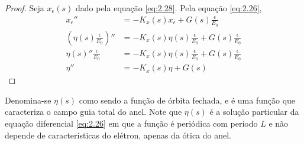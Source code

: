 \begin{proof}
	Seja $x_\epsilon(s)$ dado pela equação \eqref{eq:2.28}. Pela equação \eqref{eq:2.26},
	\begin{align*}
        x_\epsilon'' &= -K_x(s)x_\epsilon + G(s)\frac{\epsilon}{E_0}\\
        \left(\eta(s)\frac{\epsilon}{E_0}\right)'' &= -K_x(s)\eta(s)\frac{\epsilon}{E_0} + G(s)\frac{\epsilon}{E_0}\\
        \eta(s)''\frac{\epsilon}{E_0} &= -K_x(s)\eta(s)\frac{\epsilon}{E_0} + G(s)\frac{\epsilon}{E_0}\\
        \eta'' &= -K_x(s)\eta + G(s)
	\end{align*}
\end{proof}
	
Denomina-se $\eta(s)$ como sendo a função de órbita fechada, e é uma função que caracteriza o campo guia total do anel. Note que $\eta (s)$ é a solução particular da equação diferencial \eqref{eq:2.26} em que a função é periódica com período $L$ e não depende de características do elétron, apenas da ótica do anel.
